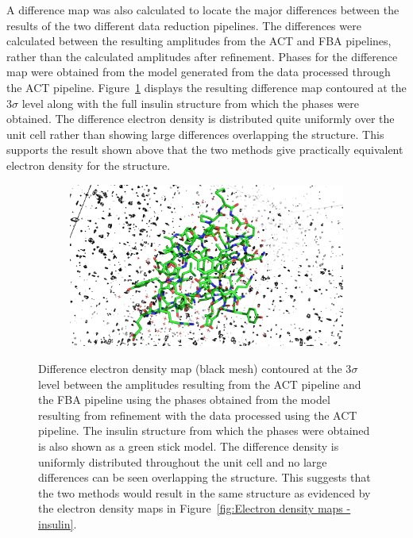 A difference map was also calculated to locate the major differences between the results of the two different data reduction pipelines.
The differences were calculated between the resulting amplitudes from the ACT and FBA pipelines, rather than the calculated amplitudes after refinement.
Phases for the difference map were obtained from the model generated from the data processed through the ACT pipeline.
Figure~\ref{fig:Difference electron density map - insulin} displays the resulting difference map contoured at the 3$\sigma$ level along with the full insulin structure from which the phases were obtained.
The difference electron density is distributed quite uniformly over the unit cell rather than showing large differences overlapping the structure.
This supports the result shown above that the two methods give practically equivalent electron density for the structure.
\begin{figure}
    \begin{subfigure}[b]{1.0\textwidth}
        \centering
        \includegraphics[width=\textwidth]{figures/datared/diff_aim_fba_insulin_seq_cnvc.png}
    \end{subfigure}
    \caption[Difference electron density map for insulin dataset.]{Difference electron density map (black mesh) contoured at the 3$\sigma$ level between the amplitudes resulting from the ACT pipeline and the FBA pipeline using the phases obtained from the model resulting from refinement with the data processed using the ACT pipeline.
    The insulin structure from which the phases were obtained is also shown as a green stick model.
    The difference density is uniformly distributed throughout the unit cell and no large differences can be seen overlapping the structure.
    This suggests that the two methods would result in the same structure as evidenced by the electron density maps in Figure~\ref{fig:Electron density maps - insulin}.}
    \label{fig:Difference electron density map - insulin}
\end{figure}

